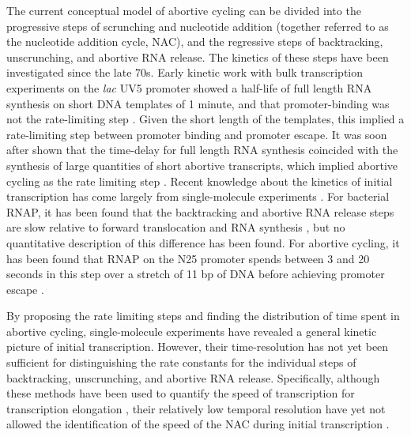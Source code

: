The current conceptual model of abortive cycling can be divided into the
progressive steps of scrunching and nucleotide addition (together referred to
as the nucleotide addition cycle, NAC), and the regressive steps of
backtracking, unscrunching, and abortive RNA release. The kinetics of these
steps have been investigated since the late 70s. Early kinetic work with
bulk transcription experiments on the \textit{lac} UV5 promoter showed a
half-life of full length RNA synthesis on short DNA templates of 1 minute, and
that promoter-binding was not the rate-limiting step \cite{stefano_lac_1979}.
Given the short length of the templates, this implied a rate-limiting step
between promoter binding and promoter escape. It was soon after shown that the
time-delay for full length RNA synthesis coincided with the synthesis of large
quantities of short abortive transcripts, which implied abortive cycling as
the rate limiting step \cite{munson_abortive_1981}. Recent knowledge about the
kinetics of initial transcription has come largely from single-molecule
experiments \cite{revyakin_abortive_2006, kapanidis_initial_2006,
tang_real-time_2009, kapanidis_retention_2005, margeat_direct_2006}. For
bacterial RNAP, it has been found that the backtracking and abortive RNA
release steps are slow relative to forward translocation and RNA synthesis
\cite{revyakin_abortive_2006, margeat_direct_2006}, but no quantitative
description of this difference has been found. For abortive cycling, it has
been found that RNAP on the N25 promoter spends between 3 and 20 seconds in
this step over a stretch of 11 bp of DNA before achieving promoter escape
\cite{revyakin_abortive_2006}.

By proposing the rate limiting steps and finding the distribution of time
spent in abortive cycling, single-molecule experiments have revealed a general
kinetic picture of initial transcription. However, their time-resolution has
not yet been sufficient for distinguishing the rate constants for the
individual steps of backtracking, unscrunching, and abortive RNA release.
Specifically, although these methods have been used to quantify the speed of
transcription for transcription elongation \cite{wang_force_1998,
tolic-norrelykke_diversity_2004}, their relatively low temporal resolution
have yet not allowed the identification of the speed of the NAC during initial
transcription \cite{revyakin_abortive_2006, margeat_direct_2006}.

